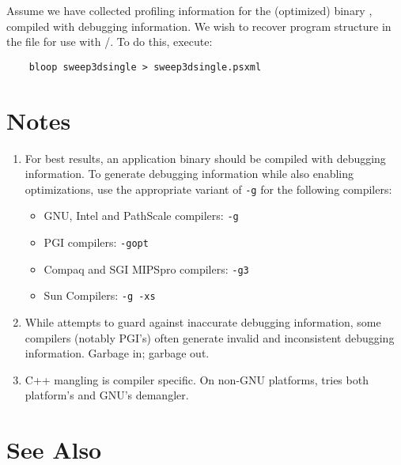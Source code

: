 \documentclass[english]{article}
\begin{document}
Assume we have collected profiling information for the (optimized) binary , compiled with debugging information.
We wish to recover program structure in the file  for use with /.
To do this, execute:
\begin{verbatim}
    bloop sweep3dsingle > sweep3dsingle.psxml
\end{verbatim}


\section{Notes}

\begin{enumerate}

\item For best results, an application binary should be compiled with debugging information.
To generate debugging information while also enabling optimizations, use the appropriate variant of \verb+-g+ for the following compilers:
\begin{itemize}
\item GNU, Intel and PathScale compilers: \verb+-g+
\item PGI compilers: \verb+-gopt+
\item Compaq and SGI MIPSpro compilers: \verb+-g3+
\item Sun Compilers: \verb+-g -xs+
\end{itemize}

\item While  attempts to guard against inaccurate debugging information, some compilers (notably PGI's) often generate invalid and inconsistent debugging information.
Garbage in; garbage out.

\item C++ mangling is compiler specific. On non-GNU platforms, 
tries both platform's and GNU's demangler.

\end{enumerate}

\section{See Also}
\end{document}
